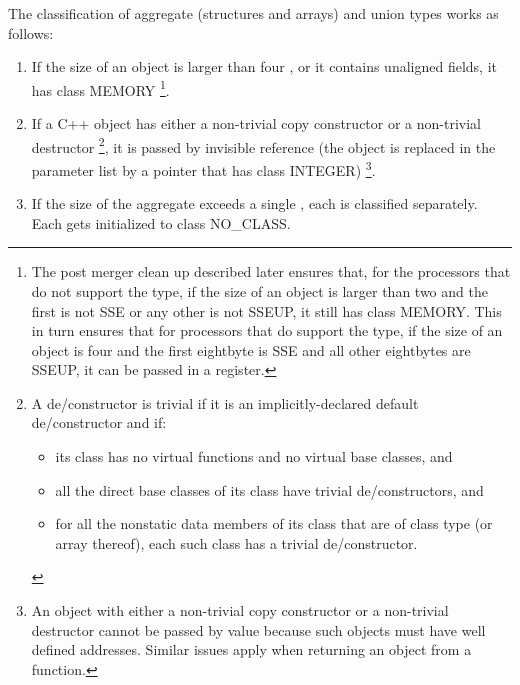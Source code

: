 The classification of aggregate (structures and arrays) and union
types works as follows:

\begin{enumerate}
\item If the size of an object is larger than four \eightbytes, or
  it contains unaligned fields, it has class MEMORY
  \footnote{The post merger clean up described later ensures that,
  for the processors that do not support the  type, if
  the size of an object is larger than two \eightbytes and the first
  \eightbyte is not SSE or any other \eightbyte is not SSEUP, it still
  has class MEMORY. This in turn ensures that for processors that
  do support the  type, if the size of an object is
  four \eightbytes and the first eightbyte is SSE and all other
  eightbytes are SSEUP, it can be passed in a register.}.

\item If a C++ object has either a non-trivial copy constructor
    or a non-trivial destructor
  \footnote{A de/constructor is trivial if it is an implicitly-declared
             default de/constructor and if:
    \begin{itemize}
        \item its class has no virtual functions
          and no virtual base classes, and

        \item all the direct base classes of its class have trivial
          de/constructors, and

        \item for all the nonstatic data members of its class that are
          of class type (or array thereof), each such class has a
          trivial de/constructor.
    \end{itemize}},
    it is passed by invisible reference
    (the object is replaced in the parameter list by a pointer that
    has class INTEGER)
  \footnote{An object with either a non-trivial copy
   constructor or a non-trivial destructor cannot be passed by value
   because such objects must have well defined addresses.  Similar
   issues apply when returning an object from a function.}.

\item If the size of the aggregate exceeds a single \eightbyte, each is
    classified separately.  Each \eightbyte gets initialized to class NO_CLASS.


\end{enumerate}
